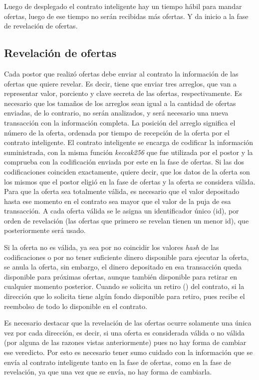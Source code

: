       Luego de desplegado el contrato inteligente hay un tiempo hábil para mandar ofertas, luego de ese tiempo no serán recibidas más 
      ofertas. Y da inicio a la fase de revelación de ofertas.

      \subsection{Revelación de ofertas}
      Cada postor que realizó ofertas debe enviar al contrato la información de las ofertas que quiere revelar. Es decir, tiene que enviar
      tres arreglos, que van a representar valor, porciento y clave secreta de las ofertas, respectivamente. Es necesario que los tamaños
      de los arreglos sean igual a la cantidad de ofertas enviadas, de lo contrario, no serán analizados, y será necesario una nueva 
      transacción con la información completa. La posición del arreglo 
      significa el número de la oferta, ordenada por tiempo de recepción de la oferta por el contrato inteligente. El contrato inteligente 
      se encarga de codificar la información suministrada, con la misma función \textit{keccak256} que fue utilizada por el postor y la 
      comprueba con la codificación enviada por este en la fase de ofertas. Si las dos codificaciones coinciden exactamente, quiere decir, 
      que los datos de la oferta son los mismos que el postor eligió en la fase de ofertas y la oferta se considera válida. Para que la
      oferta sea totalmente válida, es necesario que el valor depositado hasta ese momento en el contrato sea mayor que el valor de la
      puja de esa transacción. A cada oferta válida se le asigna un identificador único (id), por orden de revelación (las ofertas que 
      primero se revelan tienen un menor id), que posteriormente será usado.

      Si la oferta no es válida, ya sea por no coincidir los valores \textit{hash} de las codificaciones o por no tener suficiente 
      dinero disponible para ejecutar la oferta, se anula la oferta, sin embargo, el dinero depositado en esa transacción queda disponible
      para próximas ofertas, aunque también disponible para retirar en cualquier momento posterior. Cuando se solicita un retiro 
      () del contrato, si la dirección que lo solicita tiene algún fondo disponible para retiro, pues recibe el reembolso
      de todo lo disponible en el contrato.

      Es necesario destacar que la revelación de las ofertas ocurre solamente una única vez por cada dirección, es decir, si una oferta
      es considerada válida o no válida (por alguna de las razones vistas anteriormente) pues no hay forma de cambiar ese veredicto. Por 
      esto es necesario tener sumo cuidado con la información que se envía al contrato inteligente tanto en la fase de ofertas, como en
      la fase de revelación, ya que una vez que se envía, no hay forma de cambiarla.

